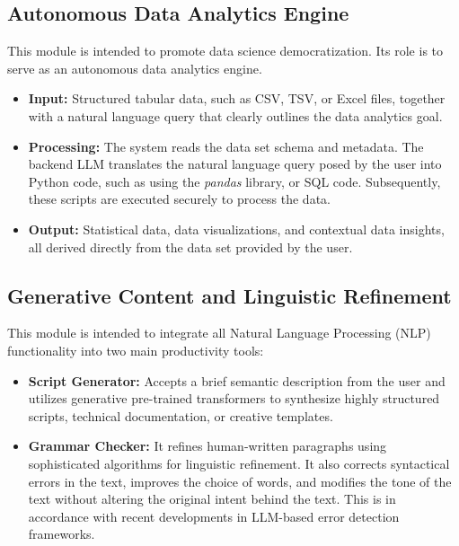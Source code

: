 \documentclass[conference]{IEEEtran}
\begin{document}
\subsection{Autonomous Data Analytics Engine}
This module is intended to promote data science democratization. Its role is to serve as an autonomous data analytics engine.
\begin{itemize}
    \item \textbf{Input:} Structured tabular data, such as CSV, TSV, or Excel files, together with a natural language query that clearly outlines the data analytics goal.
    \item \textbf{Processing:} The system reads the data set schema and metadata. The backend LLM translates the natural language query posed by the user into Python code, such as using the \textit{pandas} library, or SQL code. Subsequently, these scripts are executed securely to process the data.
    \item \textbf{Output:} Statistical data, data visualizations, and contextual data insights, all derived directly from the data set provided by the user.
\end{itemize}

\subsection{Generative Content and Linguistic Refinement}
This module is intended to integrate all Natural Language Processing (NLP) functionality into two main productivity tools:
\begin{itemize}
    \item \textbf{Script Generator:} Accepts a brief semantic description from the user and utilizes generative pre-trained transformers to synthesize highly structured scripts, technical documentation, or creative templates.
    \item \textbf{Grammar Checker:} It refines human-written paragraphs using sophisticated algorithms for linguistic refinement. It also corrects syntactical errors in the text, improves the choice of words, and modifies the tone of the text without altering the original intent behind the text. This is in accordance with recent developments in LLM-based error detection frameworks. \cite{wang2025edcew}
\end{itemize}
\end{document}
